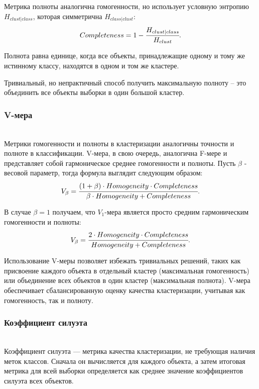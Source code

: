 Метрика полноты аналогична гомогенности, но использует условную энтропию $H_{clust \vert class}$, которая симметрична $H_{class \vert clust}$:
\begin{equation*}
    Completeness = 1 - \cfrac{H_{clust \vert class}}{H_{clust}}.
\end{equation*}

Полнота равна единице, когда все объекты, принадлежащие одному и тому же истинному классу, находятся в одном и том же кластере.

Тривиальный, но непрактичный способ получить максимальную полноту -- это объединить все объекты выборки в один большой кластер.

\subsubsection{V-мера} \hfill\\

Метрики гомогенности и полноты в кластеризации аналогичны точности и полноте в классификации.  V-мера, в свою очередь, аналогична F-мере и представляет собой гармоническое среднее гомогенности и полноты. Пусть $\beta$ - весовой параметр, тогда формула выглядит следующим образом:
\begin{equation*}
    V_\beta = \cfrac{(1+\beta) \cdot Homogeneity \cdot Completeness}{\beta \cdot Homogeneity + Completeness}.
\end{equation*}

В случае $\beta = 1$ получаем, что $V_1$-мера является просто средним гармоническим гомогенности и полноты:
\begin{equation*}
    V_\beta = \cfrac{2 \cdot Homogeneity \cdot Completeness}{Homogeneity + Completeness}.
\end{equation*}

Использование V-меры позволяет избежать тривиальных решений, таких как присвоение каждого объекта в отдельный кластер (максимальная гомогенность) или объединение всех объектов в один кластер (максимальная полнота).  V-мера обеспечивает сбалансированную оценку качества кластеризации, учитывая как гомогенность, так и полноту.

\subsubsection{Коэффициент силуэта} \hfill\\

Коэффициент силуэта — метрика качества кластеризации, не требующая наличия меток классов. Сначала он вычисляется для каждого объекта, а затем итоговая метрика для всей выборки определяется как среднее значение коэффициентов силуэта всех объектов.

